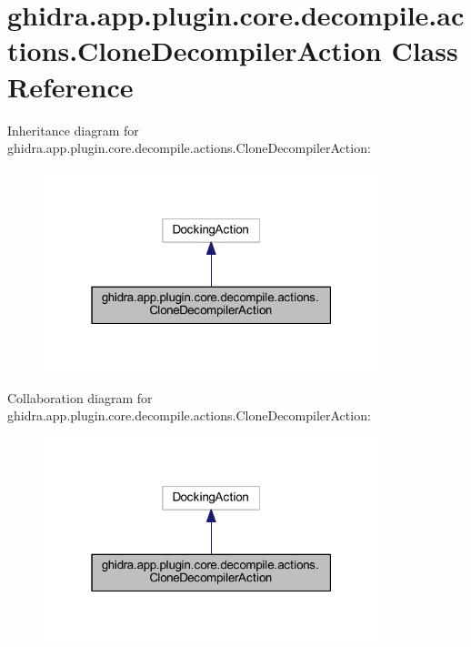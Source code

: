 \hypertarget{classghidra_1_1app_1_1plugin_1_1core_1_1decompile_1_1actions_1_1_clone_decompiler_action}{}\section{ghidra.\+app.\+plugin.\+core.\+decompile.\+actions.\+Clone\+Decompiler\+Action Class Reference}
\label{classghidra_1_1app_1_1plugin_1_1core_1_1decompile_1_1actions_1_1_clone_decompiler_action}


Inheritance diagram for ghidra.\+app.\+plugin.\+core.\+decompile.\+actions.\+Clone\+Decompiler\+Action\+:
\nopagebreak
\begin{figure}[H]
\begin{center}
\leavevmode
\includegraphics[width=277pt]{classghidra_1_1app_1_1plugin_1_1core_1_1decompile_1_1actions_1_1_clone_decompiler_action__inherit__graph}
\end{center}
\end{figure}


Collaboration diagram for ghidra.\+app.\+plugin.\+core.\+decompile.\+actions.\+Clone\+Decompiler\+Action\+:
\nopagebreak
\begin{figure}[H]
\begin{center}
\leavevmode
\includegraphics[width=277pt]{classghidra_1_1app_1_1plugin_1_1core_1_1decompile_1_1actions_1_1_clone_decompiler_action__coll__graph}
\end{center}
\end{figure}
